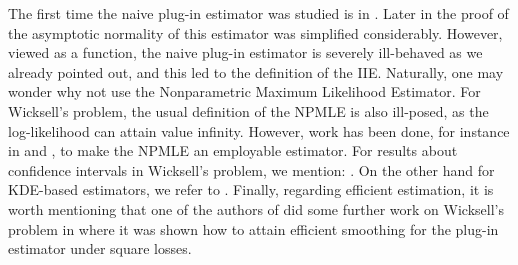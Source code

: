 The first time the naive plug-in estimator was studied is in \cite{15}. Later in \cite{1} the proof of the asymptotic normality of this estimator was simplified considerably. However, viewed as a function, the naive plug-in estimator is severely ill-behaved as we already pointed out, and this led to the definition of the IIE. Naturally, one may wonder why not use the Nonparametric Maximum Likelihood Estimator. For Wicksell's problem, the usual definition of the NPMLE is also ill-posed, as the log-likelihood can attain value infinity. However, work has been done, for instance in \cite{3} and \cite{18}, to make the NPMLE an employable estimator. For results about confidence intervals in Wicksell's problem, we mention: \cite{19, 20}. On the other hand for KDE-based estimators, we refer to \cite{16, 10}. Finally, regarding efficient estimation, it is worth mentioning that one of the authors of \cite{10} did some further work on Wicksell's problem in \cite{17} where it was shown how to attain efficient smoothing for the plug-in estimator under square losses. 


